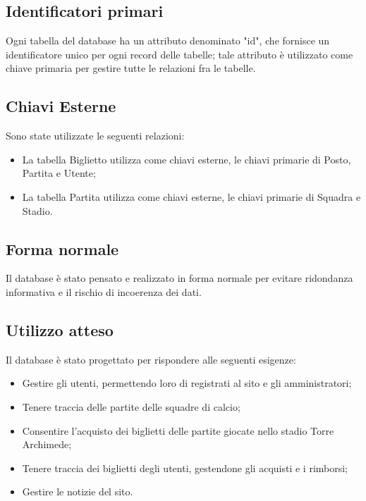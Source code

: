     \subsection{Identificatori primari}
    Ogni tabella del database ha un attributo denominato "id", che fornisce un identificatore unico per ogni record delle tabelle; tale attributo è utilizzato come chiave primaria per gestire tutte le relazioni fra le tabelle.
    \subsection{Chiavi Esterne}
    Sono state utilizzate le seguenti relazioni:
    \begin{itemize}
        \item La tabella Biglietto utilizza come chiavi esterne, le chiavi primarie di Posto, Partita e Utente;
        \item La tabella Partita utilizza come chiavi esterne, le chiavi primarie di Squadra e Stadio.
    \end{itemize}

    \subsection{Forma normale}
    Il database è stato pensato e realizzato in forma normale per evitare ridondanza informativa e il rischio di incoerenza dei dati.
    
    \subsection{Utilizzo atteso}
    Il database è stato progettato per rispondere alle seguenti esigenze:
    \begin{itemize}
        \item Gestire gli utenti, permettendo loro di registrati al sito e gli amministratori;
        \item Tenere traccia delle partite delle squadre di calcio;
        \item Consentire l’acquisto dei biglietti delle partite giocate nello stadio Torre Archimede;
        \item Tenere traccia dei biglietti degli utenti, gestendone gli acquisti e i rimborsi;
        \item Gestire le notizie del sito.
    \end{itemize}

    